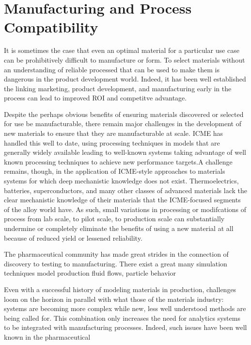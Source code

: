 \section{Manufacturing and Process Compatibility}
It is sometimes the case that even an optimal material for a particular use case can be prohibitively difficult to manufacture or form. To select materials without an understanding of reliable processed that can be used to make them is dangerous in the product development world. Indeed, it has been well established the linking marketing, product development, and manufacturing early in the process can lead to improved ROI and competitve advantage\cite{Swink2007203}.

Despite the perhaps obvious benefits of ensuring materials discovered or selected for use be manufacturable, there remain major challenges in the development of new materials to ensure that they are manufacturable at scale. ICME has handled this well to date, using processing techniques in models that are generally widely available leading to well-known systems taking advantage of well known processing techniques to achieve new performance targets.A challenge remains, though, in the application of ICME-style approaches to materials systems for which deep mechanistic knowledge does not exist. Thermoelectrics, batteries, superconductors, and many other classes of advanced materials lack the clear mechanistic knowledge of their materials that the ICME-focused segments of the alloy world have. As such, small variations in processing or modifcations of process from lab scale, to pilot scale, to production scale can substantially undermine or completely eliminate the benefits of using a new material at all because of reduced yield or lessened reliability.

The pharmaceutical community has made great strides in the connection of discovery to testing to manufacturing. There exist a great many simulation techniques model production fluid flows, particle behavior

Even with a successful history of modeling materials in production, challenges loom on the horizon in parallel with what those of the materials industry: systems are becoming more complex while new, less well understood methods are being called for. This combination only increases the need for analytics systems to be integrated with manufacturing processes\cite{JPS:JPS24594}. Indeed, such issues have been well known in the pharmaceutical




